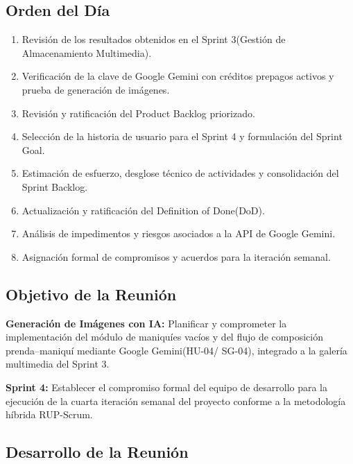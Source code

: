 \documentclass[12pt,a4paper]{article}
\begin{document}
\subsection*{Orden del Día}

\begin{enumerate}
    \item Revisión de los resultados obtenidos en el Sprint 3(Gestión de Almacenamiento Multimedia).
    \item Verificación de la clave de Google Gemini con créditos prepagos activos y prueba de generación de imágenes.
    \item Revisión y ratificación del Product Backlog priorizado.
    \item Selección de la historia de usuario para el Sprint 4 y formulación del Sprint Goal.
    \item Estimación de esfuerzo, desglose técnico de actividades y consolidación del Sprint Backlog.
    \item Actualización y ratificación del Definition of Done(DoD).
    \item Análisis de impedimentos y riesgos asociados a la API de Google Gemini.
    \item Asignación formal de compromisos y acuerdos para la iteración semanal.
\end{enumerate}

\subsection*{Objetivo de la Reunión}

\textbf{Generación de Imágenes con IA:} Planificar y comprometer la implementación del módulo de maniquíes vacíos y del flujo de composición prenda--maniquí mediante Google Gemini(HU-04/ SG-04), integrado a la galería multimedia del Sprint 3.

\textbf{Sprint 4:} Establecer el compromiso formal del equipo de desarrollo para la ejecución de la cuarta iteración semanal del proyecto conforme a la metodología híbrida RUP-Scrum.

\subsection*{Desarrollo de la Reunión}
\end{document}
